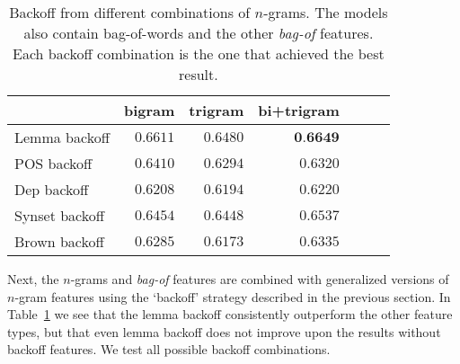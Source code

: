 \documentclass[11pt,letterpaper]{article}
\begin{document}
\begin{table}
  \begin{smaller}    
  \begin{center}
    \begin{tabular}{lrrrrrr}
      \toprule
      & bigram & trigram & bi+trigram \\
      \midrule
      Lemma backoff & $0.6611$ & $0.6480$ &  $\textbf{0.6649}$ \\ 
      POS backoff & $0.6410$ & $0.6294$ & $0.6320$ \\
      Dep backoff & $0.6208$ & $0.6194$ & $0.6220$ \\
      Synset backoff & $0.6454$ & $0.6448$ &  $0.6537$\\
      Brown backoff & $0.6285$ &  $0.6173$  & $0.6335$\\
      
      
      \bottomrule

    \end{tabular}
  \end{center}
  \caption{Backoff from different combinations of $n$-grams. The models also
    contain bag-of-words and the other \emph{bag-of} features. Each backoff combination is the one that achieved the best result.}
  \label{tab:ngrambackoff}
  \end{smaller}
\end{table}

Next, the $n$-grams and \emph{bag-of} features are combined with generalized versions of $n$-gram features using the `backoff' strategy described in the previous section. In Table~\ref{tab:ngrambackoff} we see that the lemma backoff consistently outperform the other feature types, but that even lemma backoff does not improve upon the results without backoff features. We test all possible backoff combinations.
\end{document}
